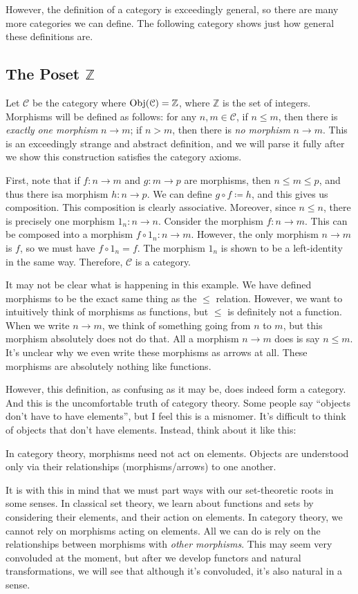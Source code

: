 However, the definition of a category is exceedingly general, so there are many more categories we can define. The following category shows just how general these definitions are.

\subsection{The Poset $\mathbb{Z} $}

Let $\mathcal{C} $ be the category where $\operatorname{Obj}(\mathcal{C} ) =\mathbb{Z} $, where $\mathbb{Z} $ is the set of integers. Morphisms will be defined as follows: for any $n,m\in \mathcal{C} $, if $n\leq m$, then there is \emph{exactly one morphism} $n\to m$; if $n>m$, then there is \emph{no morphism} $n\to m$. This is an exceedingly strange and abstract definition, and we will parse it fully after we show this construction satisfies the category axioms.

First, note that if $f : n \to m$ and $g : m \to p$ are morphisms, then $n\leq m\leq p$, and thus there isa  morphism $h : n \to p$. We can define $g\circ f\coloneqq h$, and this gives us composition. This composition is clearly associative. Moreover, since $n\leq n$, there is precisely one morphism $1_n : n \to n$. Consider the morphism $f : n \to m $. This can be composed into a morphism $f\circ 1_n : n \to m$. However, the only morphism $n\to m$ is $f$, so we must have $f\circ 1_n=f$. The morphism $1_n$ is shown to be a left-identity in the same way. Therefore, $\mathcal{C} $ is a category.

It may not be clear what is happening in this example. We have defined morphisms to be the exact same thing as the $\leq $ relation. However, we want to intuitively think of morphisms as functions, but $\leq $ is definitely not a function. When we write $n\to m$, we think of something going from $n$ to $m$, but this morphism absolutely does not do that. All a morphism $n\to m$ does is say $n\leq m$. It's unclear why we even write these morphisms as arrows at all. These morphisms are absolutely nothing like functions.

However, this definition, as confusing as it may be, does indeed form a category. And this is the uncomfortable truth of category theory. Some people say ``objects don't have to have elements'', but I feel this is a misnomer. It's difficult to think of objects that don't have elements. Instead, think about it like this:
\begin{displayquote}
	In category theory, morphisms need not act on elements. Objects are understood only via their relationships (morphisms/arrows) to one another.
	\centering
\end{displayquote}

It is with this in mind that we must part ways with our set-theoretic roots in some senses. In classical set theory, we learn about functions and sets by considering their elements, and their action on elements. In category theory, we cannot rely on morphisms acting on elements. All we can do is rely on the relationships between morphisms with \emph{other morphisms}. This may seem very convoluded at the moment, but after we develop functors and natural transformations, we will see that although it's convoluded, it's also natural in a sense.
